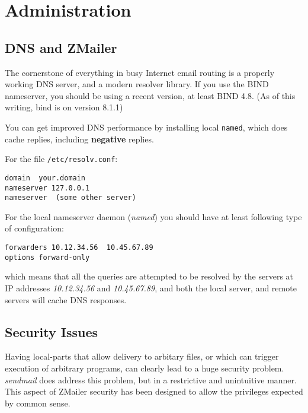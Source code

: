 \section{Administration}

\subsection{DNS and ZMailer}

The cornerstone of everything in busy Internet email routing is a properly
working DNS server, and a modern resolver library. If you use the BIND 
nameserver, you should be using a recent version, at least BIND 4.8.
(As of this writing, bind is on version 8.1.1)

You can get improved DNS performance by installing local {\tt named},
which does cache replies, including {\bf negative} replies.

For the file {\tt /etc/resolv.conf}:
\begin{tscreen}
\begin{verbatim}
domain  your.domain
nameserver 127.0.0.1
nameserver  (some other server)
\end{verbatim}
\end{tscreen}


For the local nameserver daemon ({\em named\/}) you should have
at least following type of configuration:
\begin{tscreen}
\begin{verbatim}
forwarders 10.12.34.56  10.45.67.89
options forward-only
\end{verbatim}
\end{tscreen}

which means that all the queries are attempted to be resolved
by the servers at IP addresses {\em 10.12.34.56\/} and
{\em 10.45.67.89\/}, and both the local server, and remote
servers will cache DNS responses.




\subsection{Security Issues}



Having local-parts that allow delivery to arbitary files, or which can trigger
execution of arbitrary programs, can clearly lead to a huge security
problem.  {\em sendmail\/} does address this problem, but in a restrictive and
unintuitive manner.  This aspect of ZMailer security has been designed to
allow the privileges expected by common sense.


